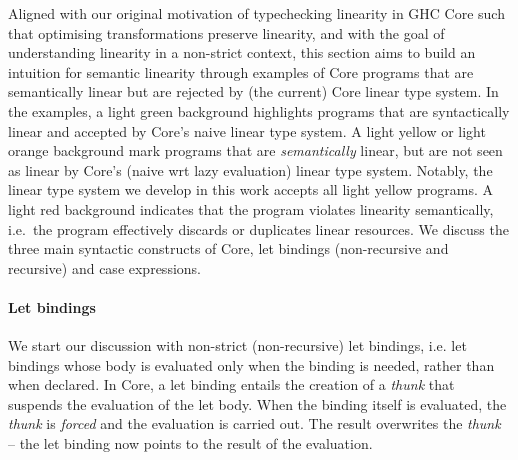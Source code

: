 \documentclass[acmsmall,review,anonymous]{acmart}
\newcommand{\workingcolorname}{light green}
\newcommand{\notyetcolorname}{light yellow}
\newcommand{\nowaycolorname}{light red}
\newcommand{\limitationcolorname}{light orange}
\begin{document}
Aligned with our original motivation of typechecking linearity in GHC Core such
that optimising transformations preserve linearity, and with the goal
of understanding linearity in a non-strict context, this section aims to
build an intuition for semantic linearity through examples of Core
programs that are semantically linear but are rejected by (the current) Core linear type
system.
%
In the examples, a \colorbox{working}{\workingcolorname} background highlights programs that are
syntactically linear and accepted by Core's naive linear type system. A
\colorbox{notyet}{\notyetcolorname} or \colorbox{limitation}{\limitationcolorname} background mark programs that are
\emph{semantically} linear, but are not seen as linear by Core's (naive wrt lazy evaluation) linear type
system. Notably, the linear type system we develop in this work accepts all
\colorbox{notyet}{\notyetcolorname} programs.
A \colorbox{noway}{\nowaycolorname} background indicates that the program
violates linearity semantically, i.e.~the program effectively
discards or duplicates linear resources. We discuss the three main
syntactic constructs of Core, let bindings (non-recursive and
recursive) and case expressions.

\paragraph{Let bindings}
We start our discussion with non-strict (non-recursive) let bindings, i.e. let bindings whose
body is evaluated only when the binding is needed, rather than when declared.
In Core, a let binding entails the creation of a \emph{thunk} that suspends the
evaluation of the let body.
When the binding itself is evaluated, the \emph{thunk} is
\emph{forced} and the evaluation is carried out. The result overwrites the
\emph{thunk} -- the let binding now points to the result of the evaluation.
\end{document}
